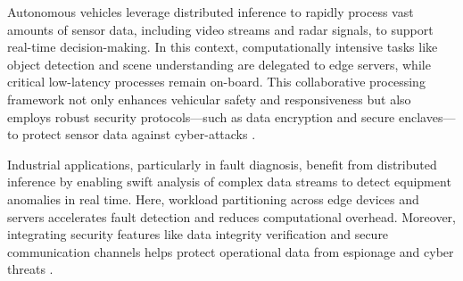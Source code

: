 \documentclass[conference]{IEEEtran}
\begin{document}


Autonomous vehicles leverage distributed inference to rapidly process vast amounts of sensor data, including video streams and radar signals, to support real-time decision-making. In this context, computationally intensive tasks like object detection and scene understanding are delegated to edge servers, while critical low-latency processes remain on-board. This collaborative processing framework not only enhances vehicular safety and responsiveness but also employs robust security protocols—such as data encryption and secure enclaves—to protect sensor data against cyber-attacks \cite{zhang2020towards, zhang2021communication, mohammed2020distributed}.

Industrial applications, particularly in fault diagnosis, benefit from distributed inference by enabling swift analysis of complex data streams to detect equipment anomalies in real time. Here, workload partitioning across edge devices and servers accelerates fault detection and reduces computational overhead. Moreover, integrating security features like data integrity verification and secure communication channels helps protect operational data from espionage and cyber threats \cite{wang2020mbnn, wang2021fast}.
\end{document}
